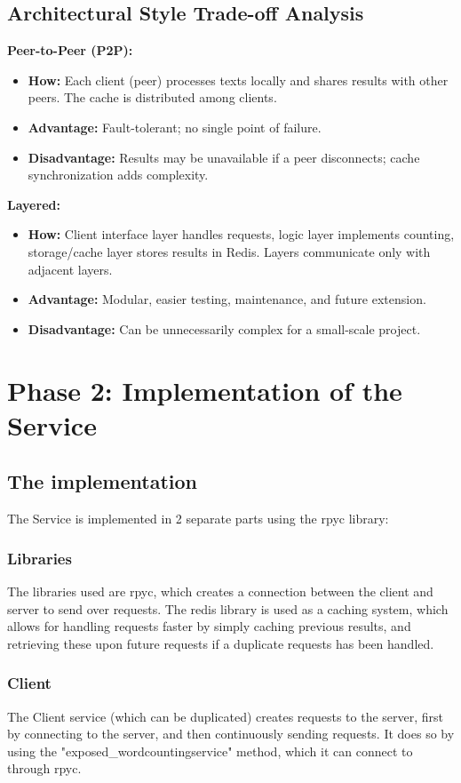 \documentclass[conference]{IEEEtran}
\begin{document}
\subsection{Architectural Style Trade-off Analysis}
\textbf{Peer-to-Peer (P2P):}
\begin{itemize}
    \item \textbf{How:} Each client (peer) processes texts locally and shares results with other peers. The cache is distributed among clients.
    \item \textbf{Advantage:} Fault-tolerant; no single point of failure.
    \item \textbf{Disadvantage:} Results may be unavailable if a peer disconnects; cache synchronization adds complexity.
\end{itemize}

\textbf{Layered:}
\begin{itemize}
    \item \textbf{How:} Client interface layer handles requests, logic layer implements counting, storage/cache layer stores results in Redis. Layers communicate only with adjacent layers.
    \item \textbf{Advantage:} Modular, easier testing, maintenance, and future extension.
    \item \textbf{Disadvantage:} Can be unnecessarily complex for a small-scale project.
\end{itemize}


\section{Phase 2: Implementation of the Service}
\subsection{The implementation}
The Service is implemented in 2 separate parts using the rpyc library:

\subsubsection{Libraries}
The libraries used are rpyc, which creates a connection between the client and server to send over requests. The redis library is used as a caching system, which allows for handling requests faster by simply caching previous results, and retrieving these upon future requests if a duplicate requests has been handled.

\subsubsection{Client}
The Client service (which can be duplicated) creates requests to the server, first by connecting to the server, and then continuously sending requests. It does so by using the "exposed\_wordcountingservice" method, which it can connect to through rpyc.
\end{document}
